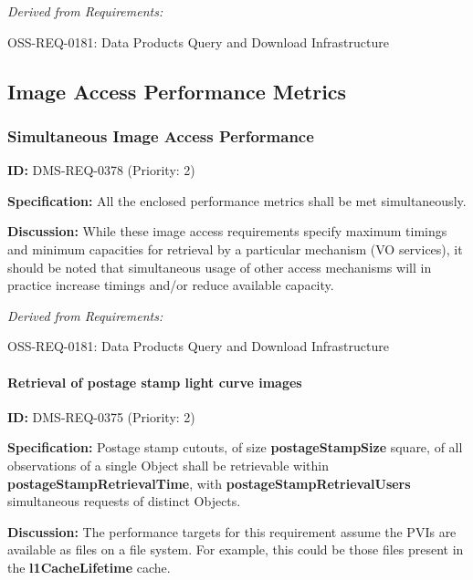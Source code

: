 \documentclass[SE,toc,lsstdraft]{lsstdoc}
\begin{document}
\emph{Derived from Requirements:}

OSS-REQ-0181:
Data Products Query and Download Infrastructure \newline

\subsection{Image Access Performance Metrics}

\subsubsection{Simultaneous Image Access Performance}

\label{DMS-REQ-0378}
\textbf{ID:} DMS-REQ-0378 (Priority: 2)

\textbf{Specification:}
All the enclosed performance metrics shall be met simultaneously.

\textbf{Discussion:}
While these image access requirements specify maximum timings and minimum capacities for retrieval by a particular mechanism (VO services), it should be noted that simultaneous usage of other access mechanisms will in practice increase timings and/or reduce available capacity.

\emph{Derived from Requirements:}

OSS-REQ-0181:
Data Products Query and Download Infrastructure \newline

\paragraph{Retrieval of postage stamp light curve images}\hfill  %

\label{DMS-REQ-0375}
\textbf{ID:} DMS-REQ-0375 (Priority: 2)

\textbf{Specification:}
Postage stamp cutouts, of size \textbf{postageStampSize} square, of all observations of a single Object shall be retrievable within \textbf{postageStampRetrievalTime}, with \textbf{postageStampRetrievalUsers} simultaneous requests of distinct Objects.

\textbf{Discussion:}
The performance targets for this requirement assume the PVIs are available as files on a file system. For example, this could be those files present in the \textbf{l1CacheLifetime} cache.
\end{document}
